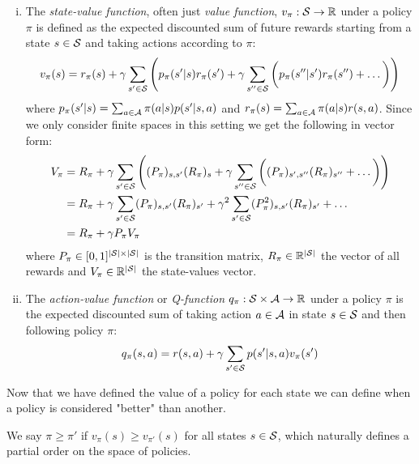 \begin{definition}
    \label{def:value}
    \begin{enumerate}[(i)]
        \item The \emph{state-value function}, often just \emph{value function}, $v_\pi: \S \to \R$ under a policy $\pi$ is defined as the expected discounted sum of future rewards starting from a state $s \in \S$ and taking actions according to $\pi$:
              $$v_\pi(s) = r_\pi(s) + \gamma \sum_{s' \in \S} \left( p_\pi(s' | s) r_\pi(s') + \gamma \sum_{s'' \in \S} \bigg( p_\pi(s'' | s') r_\pi(s'') + \dots \bigg) \right)$$
              where $p_\pi(s' | s) = \sum_{a \in \A} \pi(a | s) p(s' | s, a)$ and $r_\pi(s) = \sum_{a \in \A} \pi(a | s) r(s, a)$.
              Since we only consider finite spaces in this setting we get the following in vector form:
              \begin{align*}
                  V_\pi & = R_\pi + \gamma \sum_{s' \in \S}\left( (P_\pi)_{s,s'} (R_\pi)_s + \gamma \sum_{s'' \in \S} \bigg( (P_\pi)_{s',s''} (R_\pi)_{s''} + \dots \bigg) \right) \\
                        & = R_\pi + \gamma \sum_{s' \in \S} (P_\pi)_{s,s'} (R_\pi)_{s'} + \gamma^2 \sum_{s' \in \S} (P_\pi^2)_{s,s'} (R_\pi)_{s'} + \dots                          \\
                        & = R_\pi + \gamma P_\pi V_\pi
              \end{align*}
              where $P_\pi \in [0,1]^{|\S| \times |\S|}$ is the transition matrix, $R_\pi \in \R^{|\S|}$ the vector of all rewards and $V_\pi \in \R^{|\S|}$ the state-values vector.

        \item The \emph{action-value function} or \emph{Q-function} $q_\pi: \S \times \A \to \R$ under a policy $\pi$ is the expected discounted sum of taking action $a \in \A$ in state $s \in \S$ and then following policy $\pi$:
              $$q_\pi(s, a) = r(s, a) + \gamma \sum_{s' \in \S} p(s' | s, a) v_\pi(s')$$
    \end{enumerate}
\end{definition}

Now that we have defined the value of a policy for each state we can define when a policy is considered "better" than another.

\begin{definition}
    \label{def:policy-order}
    We say $\pi \ge \pi'$ if $v_\pi(s) \ge v_{\pi'}(s)$ for all states $s \in \S$, which naturally defines a partial order on the space of policies.
\end{definition}

